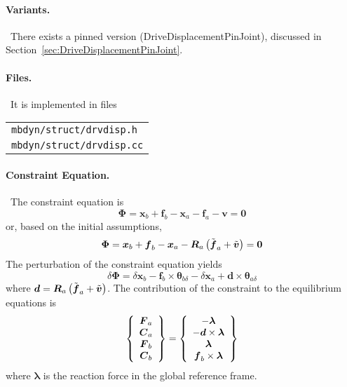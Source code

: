\documentclass[10pt,dvips,fleqn]{report}
\newcommand{\T}[1]{\boldsymbol{#1}}
\begin{document}
\paragraph{Variants.} \
There exists a pinned version (DriveDisplacementPinJoint),
discussed in Section~\ref{sec:DriveDisplacementPinJoint}.

\paragraph{Files.} \
It is implemented in files

\begin{tabular}{l}
\texttt{mbdyn/struct/drvdisp.h} \\
\texttt{mbdyn/struct/drvdisp.cc}
\end{tabular}

\paragraph{Constraint Equation.} \
The constraint equation is
\begin{equation}
	\T{\Phi} = \T{x}_b + \T{f}_b - \T{x}_a - \T{f}_a - \T{v} = \T{0}
\end{equation}
or, based on the initial assumptions,
\begin{equation}
	\T{\Phi} = \T{x}_b + \T{f}_b - \T{x}_a
		- \T{R}_a\plbr{\tilde{\T{f}}_a + \tilde{\T{v}}} = \T{0}
\end{equation}
The perturbation of the constraint equation yields
\begin{equation}
	\delta\T{\Phi} = 
		\delta\T{x}_b
		- \T{f}_b\times\T{\theta}_{b\delta}
		- \delta\T{x}_a
		+ \T{d}\times\T{\theta}_{a\delta}
\end{equation}
where $\T{d}=\T{R}_a\plbr{\tilde{\T{f}}_a + \tilde{\T{v}}}$.
The contribution of the constraint to the equilibrium equations is
\begin{equation}
	\cubr{\cvvect{
		\T{F}_a \\
		\T{C}_a \\
		\T{F}_b \\
		\T{C}_b
	}} = \cubr{\cvvect{
		- \T{\lambda} \\
		- \T{d}\times\T{\lambda} \\
		\T{\lambda} \\
		\T{f}_b\times\T{\lambda}
	}}
\end{equation}
where $\T{\lambda}$ is the reaction force in the global reference frame.
\end{document}
